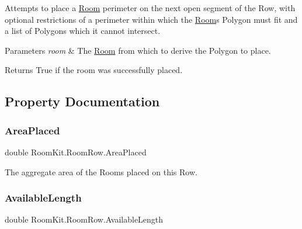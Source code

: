 Attempts to place a \mbox{\hyperlink{class_room_kit_1_1_room}{Room}} perimeter on the next open segment of the Row, with optional restrictions of a perimeter within which the \mbox{\hyperlink{class_room_kit_1_1_room}{Room}}\textquotesingle{}s Polygon must fit and a list of Polygons which it cannot intersect. 


\begin{DoxyParams}{Parameters}
{\em room} & The \mbox{\hyperlink{class_room_kit_1_1_room}{Room}} from which to derive the Polygon to place.\\
\hline
\end{DoxyParams}
\begin{DoxyReturn}{Returns}
True if the room was successfully placed. 
\end{DoxyReturn}


\subsection{Property Documentation}
\mbox{\label{class_room_kit_1_1_room_row_a2ee541d26536306906eeb29953e496ed}} 
\subsubsection{\texorpdfstring{Area\+Placed}{AreaPlaced}}
{\footnotesize\ttfamily double Room\+Kit.\+Room\+Row.\+Area\+Placed\hspace{0.3cm}{\ttfamily [get]}}



The aggregate area of the Rooms placed on this Row. 

\mbox{\label{class_room_kit_1_1_room_row_a641180f7b37e1cb23b47b2a47441f6ea}} 
\subsubsection{\texorpdfstring{Available\+Length}{AvailableLength}}
{\footnotesize\ttfamily double Room\+Kit.\+Room\+Row.\+Available\+Length\hspace{0.3cm}{\ttfamily [get]}}



